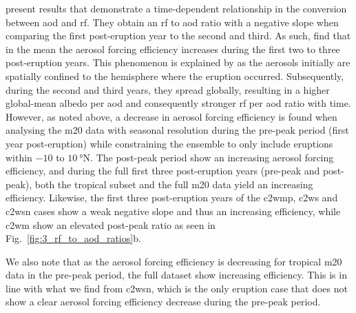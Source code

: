 \documentclass{ametsocV6.1}
\begin{document}
\citet[][their Fig.\ 1c,d]{marshall2020} present results that demonstrate a
time-dependent relationship in the conversion between \gls{aod} and \gls{rf}. They
obtain an \gls{rf} to \gls{aod} ratio with a negative slope when comparing the first
post-eruption year to the second and third. As such, \citet{marshall2020} find that in
the mean the aerosol forcing efficiency increases during the first two to three
post-eruption years. This phenomenon is explained by \citet{marshall2020} as the
aerosols initially are spatially confined to the hemisphere where the eruption occurred.
Subsequently, during the second and third years, they spread globally, resulting in a
higher global-mean albedo per \gls{aod} and consequently stronger \gls{rf} per \gls{aod}
ratio with time. However, as noted above, a decrease in aerosol forcing efficiency is
found when analysing the \gls{m20} data with seasonal resolution during the pre-peak
period (first year post-eruption) while constraining the ensemble to only include
eruptions within \(-10\) to \(\SI{10}{\degree\mathrm{N}}\). The post-peak period show an
increasing aerosol forcing efficiency, and during the full first three post-eruption
years (pre-peak and post-peak), both the tropical subset and the full \gls{m20} data
yield an increasing efficiency. Likewise, the first three post-eruption years of the
\gls{c2wmp}, \gls{c2ws} and \gls{c2wsn} cases show a weak negative slope and thus an
increasing efficiency, while \gls{c2wm} show an elevated post-peak ratio as seen in
Fig.~\ref{fig:3_rf_to_aod_ratios}b.

We also note that as the aerosol forcing efficiency is decreasing for tropical \gls{m20}
data in the pre-peak period, the full dataset show increasing efficiency. This is in
line with what we find from \gls{c2wsn}, which is the only eruption case that does not
show a clear aerosol forcing efficiency decrease during the pre-peak period.
\end{document}
